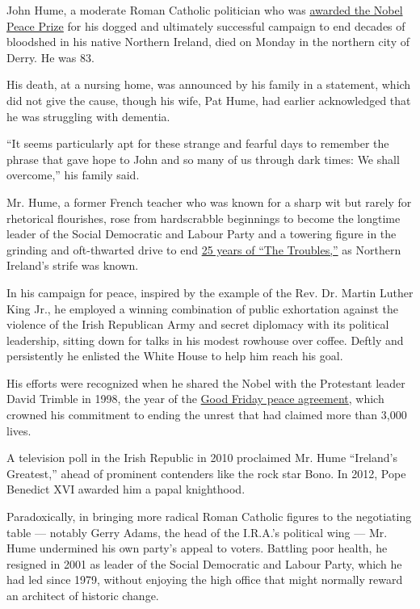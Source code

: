 John Hume, a moderate Roman Catholic politician who was
\href{https://www.nytimes.com/1998/10/17/world/2-ulster-peacemakers-win-the-nobel-prize.html}{awarded
the Nobel Peace Prize} for his dogged and ultimately successful campaign
to end decades of bloodshed in his native Northern Ireland, died on
Monday in the northern city of Derry. He was 83.

His death, at a nursing home, was announced by his family in a
statement, which did not give the cause, though his wife, Pat Hume, had
earlier acknowledged that he was struggling with dementia.

``It seems particularly apt for these strange and fearful days to
remember the phrase that gave hope to John and so many of us through
dark times: We shall overcome,'' his family said.

Mr. Hume, a former French teacher who was known for a sharp wit but
rarely for rhetorical flourishes, rose from hardscrabble beginnings to
become the longtime leader of the Social Democratic and Labour Party and
a towering figure in the grinding and oft-thwarted drive to end
\href{https://www.nytimes.com/2018/10/04/world/europe/northern-ireland-troubles.html}{25
years of ``The Troubles,''} as Northern Ireland's strife was known.

In his campaign for peace, inspired by the example of the Rev. Dr.
Martin Luther King Jr., he employed a winning combination of public
exhortation against the violence of the Irish Republican Army and secret
diplomacy with its political leadership, sitting down for talks in his
modest rowhouse over coffee. Deftly and persistently he enlisted the
White House to help him reach his goal.

His efforts were recognized when he shared the Nobel with the Protestant
leader David Trimble in 1998, the year of the
\href{https://www.nytimes.com/1998/04/11/world/irish-accord-overview-irish-talks-produce-accord-stop-decades-bloodshed-with.html}{Good
Friday peace agreement}, which crowned his commitment to ending the
unrest that had claimed more than 3,000 lives.

A television poll in the Irish Republic in 2010 proclaimed Mr. Hume
``Ireland's Greatest,'' ahead of prominent contenders like the rock star
Bono. In 2012, Pope Benedict XVI awarded him a papal knighthood.

Paradoxically, in bringing more radical Roman Catholic figures to the
negotiating table --- notably Gerry Adams, the head of the I.R.A.'s
political wing --- Mr. Hume undermined his own party's appeal to voters.
Battling poor health, he resigned in 2001 as leader of the Social
Democratic and Labour Party, which he had led since 1979, without
enjoying the high office that might normally reward an architect of
historic change.

